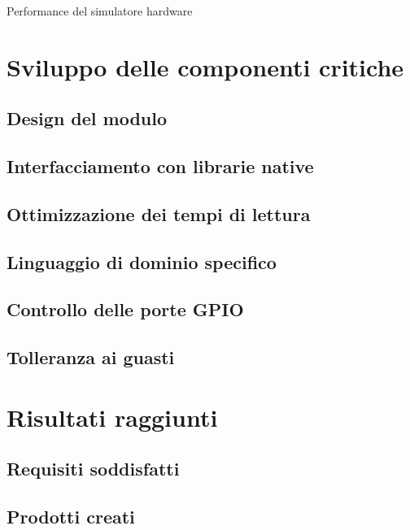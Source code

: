 \begin{risk}{Performance del simulatore hardware}
    \label{risk:hardware-simulator} 
\end{risk}

\section{Sviluppo delle componenti critiche}
\subsection{Design del modulo}
\subsection{Interfacciamento con librarie native}
\subsection{Ottimizzazione dei tempi di lettura}
\subsection{Linguaggio di dominio specifico}
\subsection{Controllo delle porte GPIO}
\subsection{Tolleranza ai guasti}


\section{Risultati raggiunti}
\subsection{Requisiti soddisfatti}
\subsection{Prodotti creati}